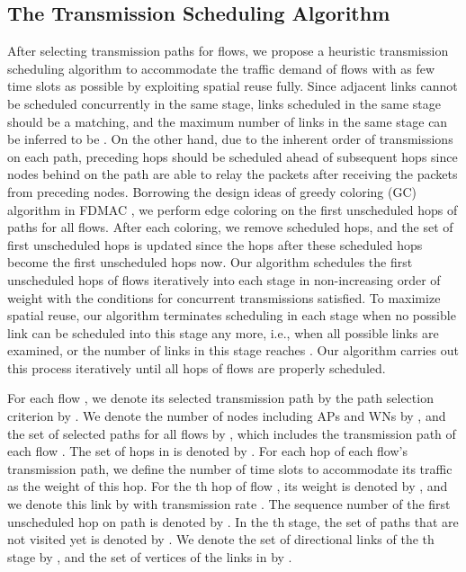 \documentclass[journal]{IEEEtran}
\begin{document}
\subsection{The Transmission Scheduling Algorithm}\label{S5-2}

After selecting transmission paths for flows, we propose a heuristic transmission scheduling algorithm to
accommodate the traffic demand of flows with as few time slots as possible by exploiting spatial reuse fully. Since adjacent links cannot be scheduled concurrently in the same stage, links scheduled in the
same stage should be a matching, and the maximum number of links in
the same stage can be inferred to be  \cite{mao}. On the other hand, due to the
inherent order of transmissions on each path, preceding hops should be scheduled ahead of
subsequent hops since nodes behind on the path are able to relay the packets after receiving the packets from preceding nodes. Borrowing the design ideas of greedy coloring (GC) algorithm in FDMAC \cite{mao},
we perform edge coloring on the first unscheduled hops of paths for all flows. After each coloring,
we remove scheduled hops, and the set of first unscheduled hops is updated since the hops after
these scheduled hops become the first unscheduled hops now. Our algorithm schedules the
first unscheduled hops of flows iteratively into each stage in non-increasing order of weight with the conditions for
concurrent transmissions satisfied. To maximize spatial reuse, our
algorithm terminates scheduling in each stage when no possible link can be scheduled into this stage any more, i.e., when all
possible links are examined, or the number of links in this stage reaches . Our algorithm carries out this process iteratively until all hops of flows are
properly scheduled.



For each
flow , we denote its selected transmission path by the path selection criterion by . We denote the number of nodes including APs and WNs by , and the set of
selected paths for all flows by , which includes the transmission path  of each flow .
The set of hops in  is denoted by . For each
hop of each flow's transmission path, we define the number of time slots to accommodate its traffic
as the weight of this hop. For the th hop of flow , its weight is denoted by , and we
denote this link by  with transmission rate . The sequence number of the
first unscheduled hop on path  is denoted by . In the th stage, the set of paths
that are not visited yet is denoted by . We denote the set of directional links of the
th stage by , and the set of vertices of the links in  by .
\end{document}
